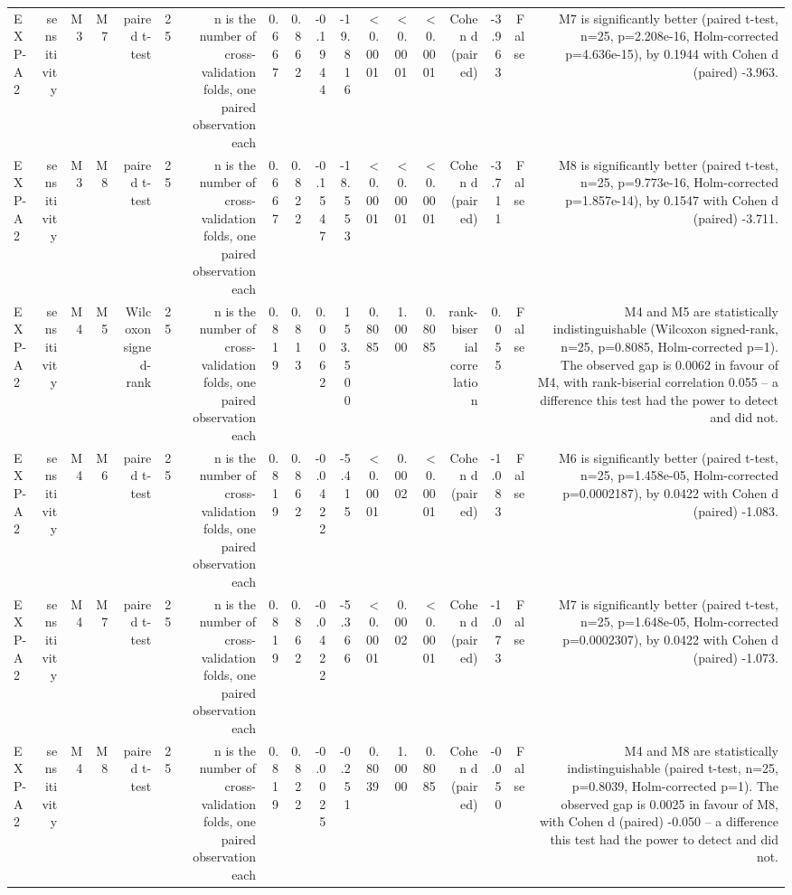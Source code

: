 \begin{table}[htbp]
\begin{tabular}{lrrrrrrrrrrrrrrrrr}
    EXP-A2 & sensitivity & M3 & M7 & paired t-test & 25 & n is the number of cross-validation folds, one paired observation each & 0.667 & 0.862 & -0.1944 & -19.816 & <0.0001 & <0.0001 & <0.0001 & Cohen d (paired) & -3.963 & False & M7 is significantly better (paired t-test, n=25, p=2.208e-16, Holm-corrected p=4.636e-15), by 0.1944 with Cohen d (paired) -3.963. \\
    EXP-A2 & sensitivity & M3 & M8 & paired t-test & 25 & n is the number of cross-validation folds, one paired observation each & 0.667 & 0.822 & -0.1547 & -18.553 & <0.0001 & <0.0001 & <0.0001 & Cohen d (paired) & -3.711 & False & M8 is significantly better (paired t-test, n=25, p=9.773e-16, Holm-corrected p=1.857e-14), by 0.1547 with Cohen d (paired) -3.711. \\
    EXP-A2 & sensitivity & M4 & M5 & Wilcoxon signed-rank & 25 & n is the number of cross-validation folds, one paired observation each & 0.819 & 0.813 & 0.0062 & 153.500 & 0.8085 & 1.0000 & 0.8085 & rank-biserial correlation & 0.055 & False & M4 and M5 are statistically indistinguishable (Wilcoxon signed-rank, n=25, p=0.8085, Holm-corrected p=1). The observed gap is 0.0062 in favour of M4, with rank-biserial correlation 0.055 -- a difference this test had the power to detect and did not. \\
    EXP-A2 & sensitivity & M4 & M6 & paired t-test & 25 & n is the number of cross-validation folds, one paired observation each & 0.819 & 0.862 & -0.0422 & -5.415 & <0.0001 & 0.0002 & <0.0001 & Cohen d (paired) & -1.083 & False & M6 is significantly better (paired t-test, n=25, p=1.458e-05, Holm-corrected p=0.0002187), by 0.0422 with Cohen d (paired) -1.083. \\
    EXP-A2 & sensitivity & M4 & M7 & paired t-test & 25 & n is the number of cross-validation folds, one paired observation each & 0.819 & 0.862 & -0.0422 & -5.366 & <0.0001 & 0.0002 & <0.0001 & Cohen d (paired) & -1.073 & False & M7 is significantly better (paired t-test, n=25, p=1.648e-05, Holm-corrected p=0.0002307), by 0.0422 with Cohen d (paired) -1.073. \\
    EXP-A2 & sensitivity & M4 & M8 & paired t-test & 25 & n is the number of cross-validation folds, one paired observation each & 0.819 & 0.822 & -0.0025 & -0.251 & 0.8039 & 1.0000 & 0.8085 & Cohen d (paired) & -0.050 & False & M4 and M8 are statistically indistinguishable (paired t-test, n=25, p=0.8039, Holm-corrected p=1). The observed gap is 0.0025 in favour of M8, with Cohen d (paired) -0.050 -- a difference this test had the power to detect and did not. \\

\end{tabular}
\end{table}

